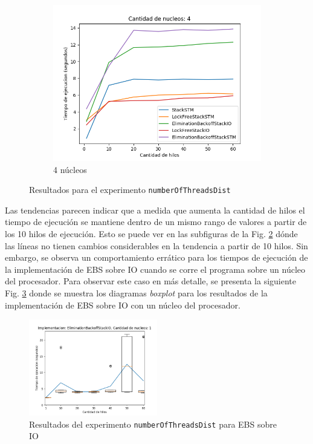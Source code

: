 \begin{figure}[!h]
\begin{subfigure}[b]{0.5\textwidth}
        \includegraphics[width=\textwidth]{images/numberOfThreadsDist/plots/4.png}
        \caption{4 núcleos}
        \label{subfig:numberOfThreadsDist-4core}
    \end{subfigure}
    \caption{Resultados para el experimento \texttt{numberOfThreadsDist}}
    \label{fig:numberOfThreadsDist-all}
\end{figure}

Las tendencias parecen indicar que a medida que aumenta la cantidad de hilos el tiempo de ejecución se mantiene dentro de un mismo rango de valores a partir de los 10 hilos de ejecución. Esto se puede ver en las subfiguras de la Fig. \ref{fig:numberOfThreadsDist-all} dónde las líneas no tienen cambios considerables en la tendencia a partir de 10 hilos.
Sin embargo, se observa un comportamiento errático para los tiempos de ejecución de la implementación de EBS sobre IO cuando se corre el programa sobre un núcleo del procesador.
Para observar este caso en más detalle, se presenta la siguiente Fig. \ref{fig:numberOfThreadsDist-EBSIO} donde se muestra los diagramas \emph{boxplot} para los resultados de la implementación de EBS sobre IO con un núcleo del procesador.

\clearpage
\begin{figure}[!h]
    \centering
    \includegraphics[width=0.5\textwidth]{images/numberOfThreadsDist/plots/expEBSIO-1.png}
    \caption{Resultados del experimento \texttt{numberOfThreadsDist} para EBS sobre IO}
    \label{fig:numberOfThreadsDist-EBSIO}
\end{figure}

